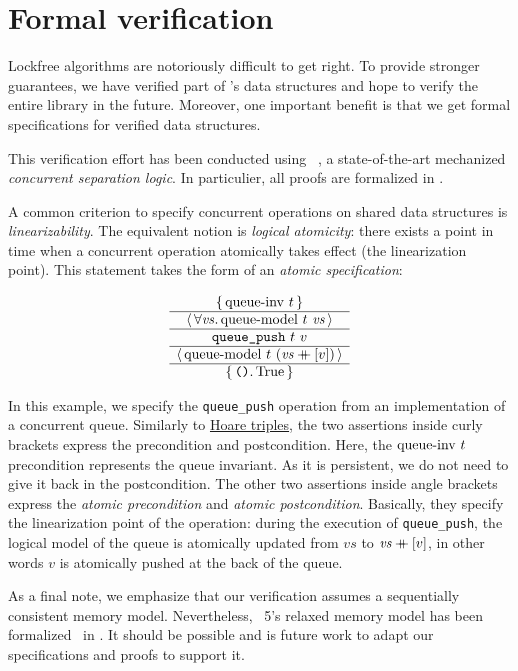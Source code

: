\documentclass[a4paper, 11pt]{article}
\begin{document}
\section{Formal verification}

Lockfree algorithms are notoriously difficult to get right.
To provide stronger guarantees, we have verified part of \Saturn's data structures and hope to verify the entire library in the future.
Moreover, one important benefit is that we get formal specifications for verified data structures.

This verification effort has been conducted using \Iris~\cite{DBLP:journals/jfp/JungKJBBD18}, a state-of-the-art mechanized \emph{concurrent separation logic}.
In particulier, all proofs are formalized in \Coq.

A common criterion to specify concurrent operations on shared data structures is \emph{linearizability}.
The equivalent \Iris notion is \emph{logical atomicity}: there exists a point in time when a concurrent operation atomically takes effect (the linearization point).
This statement takes the form of an \emph{atomic specification}:

\[
  \begin{array}{c} \left\lbrace\, 
    \mathrm{queue {\hbox{-}} inv}\ t
   \,\right\rbrace \\ \hline \left\langle\, \forall 
    \mathit{vs}
   \ldotp 
    \mathrm{queue {\hbox{-}} model}\ t\  \mathit{vs}
   \,\right\rangle \\ \hline 
    \texttt{queue\_push}\ t\ v
   \\ \hline \left\langle\, 
    \mathrm{queue {\hbox{-}} model}\ t\  (\mathit{vs} \mathbin{+\mkern-10mu+} [v])
   \,\right\rangle \\ \hline \left\lbrace\, 
    \texttt{()}
   \ldotp 
    \mathrm{True}
   \,\right\rbrace \end{array}
\]

In this example, we specify the \texttt{queue\_push} operation from an implementation of a concurrent queue.
Similarly to \href{https://en.wikipedia.org/wiki/Hoare_logic}{Hoare triples}, the two assertions inside curly brackets express the precondition and postcondition.
Here, the $\mathrm{queue {\hbox{-}} inv}\ t$ precondition represents the queue invariant.
As it is persistent, we do not need to give it back in the postcondition.
The other two assertions inside angle brackets express the \emph{atomic precondition} and \emph{atomic postcondition}.
Basically, they specify the linearization point of the operation: during the execution of \texttt{queue\_push}, the logical model of the queue is atomically updated from $\mathit{vs}$ to $\mathit{vs} \mathbin{+\mkern-10mu+} [v]$, in other words $v$ is atomically pushed at the back of the queue.

As a final note, we emphasize that our verification assumes a sequentially consistent memory model.
Nevertheless, \OCaml~5's relaxed memory model has been formalized~\cite{DBLP:journals/pacmpl/MevelJP20} in \Iris.
It should be possible and is future work to adapt our specifications and proofs to support it.
\end{document}
